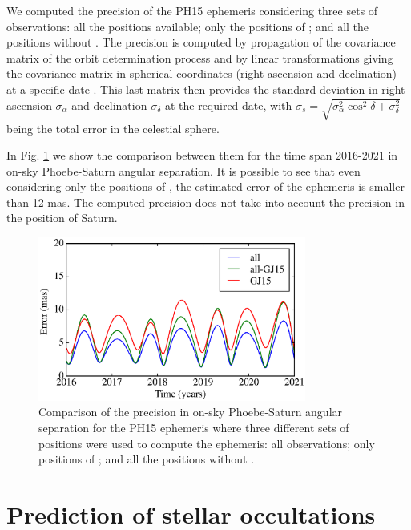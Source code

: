 \documentclass[useAMS,usenatbib]{mn2e}
\begin{document}
We computed the precision of the PH15 ephemeris considering three sets of observations: all the positions available; only the positions of ; and all the positions without .
The precision is computed by propagation of the covariance matrix of the orbit determination process and by linear transformations giving the covariance matrix in spherical coordinates (right ascension and declination) at a specific date \citep[for more details, see][]{Desmars2013a}. This last matrix then provides the standard deviation in right ascension $\sigma_\alpha$ and declination  $\sigma_\delta$ at the required date, with $\sigma_s=\sqrt{\sigma^2_\alpha\cos^2\delta+\sigma^2_\delta}$ being the total error in the celestial sphere.


In Fig. \ref{Fig:err-Phoebe} we show the comparison between them for the time span 2016-2021 in on-sky Phoebe-Saturn angular separation. It is possible to see that even considering only the positions of , the estimated error of the ephemeris is smaller than 12 mas. The computed precision does not take into account the precision in the position of Saturn.

\begin{figure}
\begin{centering}
\includegraphics[width=8.8cm]{figures/PH15_err_angsep.eps}  
\caption{Comparison of the precision in on-sky Phoebe-Saturn angular separation for the PH15 ephemeris where three different sets of positions were used to compute the ephemeris: all observations; only positions of ; and all the positions without .}
\label{Fig:err-Phoebe}
\end{centering}
\end{figure}


\section{Prediction of stellar occultations} \label{Sec: predictions}
\end{document}
